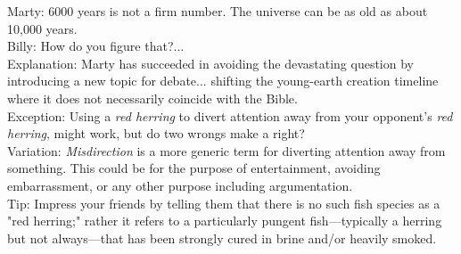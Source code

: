 \documentclass[a4paper,12pt,single,pdftex]{scrartcl}
\begin{document}
{      
        Marty: 6000 years is not a firm number.  The universe can be as old as about 10,000 years.
      \\

      
        Billy: How do you figure that?...
      \\

      
        Explanation: Marty has succeeded in avoiding the devastating question by introducing a new topic for debate... shifting the young-earth creation timeline where it does not necessarily coincide with the Bible.
      \\

      
        Exception: Using a {\it red herring} to divert attention away from your opponent's {\it red herring}, might work, but do two wrongs make a right?
      \\

      
        Variation: {\em Misdirection} is a more generic term for diverting attention away from something. This could be for the purpose of entertainment, avoiding embarrassment, or any other purpose including argumentation.
      \\

      
        Tip: Impress your friends by telling them that there is no such fish species as a "red herring;" rather it refers to a particularly pungent fish—typically a herring but not always—that has been strongly cured in brine and/or heavily smoked.
      \\

    
  }
\end{document}
